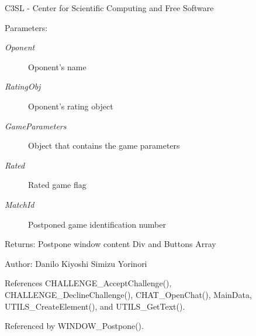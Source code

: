 C3SL - Center for Scientific Computing and Free Software \begin{Desc}
\item[Parameters:]
\begin{description}
\item[{\em Oponent}]Oponent's name \item[{\em RatingObj}]Oponent's rating object \item[{\em GameParameters}]Object that contains the game parameters \item[{\em Rated}]Rated game flag \item[{\em MatchId}]Postponed game identification number \end{description}
\end{Desc}
\begin{Desc}
\item[Returns:]Postpone window content Div and Buttons Array \end{Desc}
\begin{Desc}
\item[Author:]Danilo Kiyoshi Simizu Yorinori \end{Desc}


References CHALLENGE\_\-AcceptChallenge(), CHALLENGE\_\-DeclineChallenge(), CHAT\_\-OpenChat(), MainData, UTILS\_\-CreateElement(), and UTILS\_\-GetText().

Referenced by WINDOW\_\-Postpone().